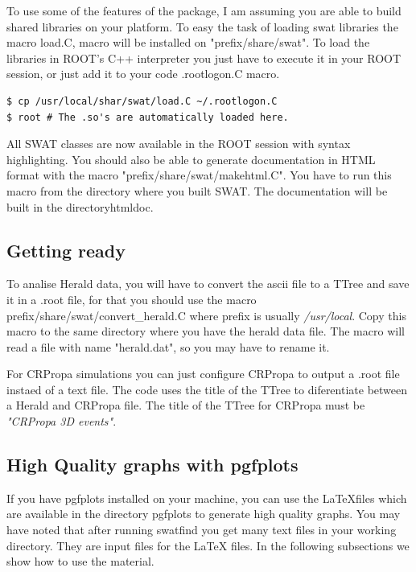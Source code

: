 \documentclass[12pt]{article}
\begin{document}
To use some of the features of the package, I am assuming you are able to build
shared libraries on your platform.  To easy the task of loading swat libraries
the macro load.C, macro will be installed on
{\color{brown}"prefix/share/swat"}. To load the libraries in ROOT's C++
interpreter you just have to execute it in your ROOT session, or just
add it to your code {\color{brown}.rootlogon.C} macro.

{ \color{brown}
\begin{lstlisting}
$ cp /usr/local/shar/swat/load.C ~/.rootlogon.C
$ root # The .so's are automatically loaded here.
\end{lstlisting}
}

All SWAT classes are now available in the ROOT session with syntax
highlighting. You should also be able to generate documentation in HTML format
with the macro {\color{brown}"prefix/share/swat/makehtml.C"}. You have to run
this macro from the directory where you built SWAT. The documentation will be
built in the directory{\color{brown}htmldoc}.

\subsection{Getting ready} \label{ch::ready}
To analise Herald data, you will have to convert the ascii file to a TTree and
save it in a .root file, for that you should use the macro
{\color{brown}prefix/share/swat/convert\_herald.C} where prefix is usually
\textit{/usr/local}.  Copy this macro to the same directory where you have the
herald data file. The macro will read a file with name
{\color{brown}"herald.dat"}, so you may have to rename it. 

For CRPropa simulations you can just configure CRPropa to output a .root file
instaed of a text file.  The code uses the title of the TTree to diferentiate
between a Herald and CRPropa file. The title of the TTree for CRPropa must be
\textit{\color{brown}"CRPropa 3D events"}.

\subsection{High Quality graphs with pgfplots} \label{ch::pgfplots}
If you have pgfplots installed on your machine, you can use the \LaTeX files
which are available in the directory pgfplots to generate high quality
graphs. You may have noted that after running {\color{brown}swatfind} you get
many text files in your working directory. They are input files for the \LaTeX
files. In the following subsections we show how to use the material.
\end{document}
